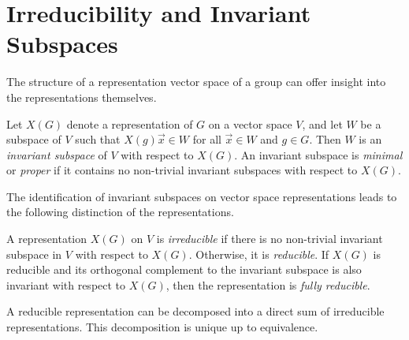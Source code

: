 \section{Irreducibility and Invariant Subspaces}

The structure of a representation vector space of a group can offer insight into the representations themselves.
\begin{definition}
    Let $X(G)$ denote a representation of $G$ on a vector space $V$, and let $W$ be a subspace of $V$ such that $X(g)\vec{x}\in W$ for all $\vec{x}\in W$ and $g\in G$. Then $W$ is an \textit{invariant subspace} of $V$ with respect to $X(G)$. An invariant subspace is \textit{minimal} or \textit{proper} if it contains no non-trivial invariant subspaces with respect to $X(G)$.
\end{definition}

The identification of invariant subspaces on vector space representations leads to the following distinction of the representations.
\begin{definition}
    A representation $X(G)$ on $V$ is \textit{irreducible} if there is no non-trivial invariant subspace in $V$ with respect to $X(G)$. Otherwise, it is \textit{reducible}. If $X(G)$ is reducible and its orthogonal complement to the invariant subspace is also invariant with respect to $X(G)$, then the representation is \textit{fully reducible}.
\end{definition}

A reducible representation can be decomposed into a direct sum of irreducible representations. This decomposition is unique up to equivalence.

